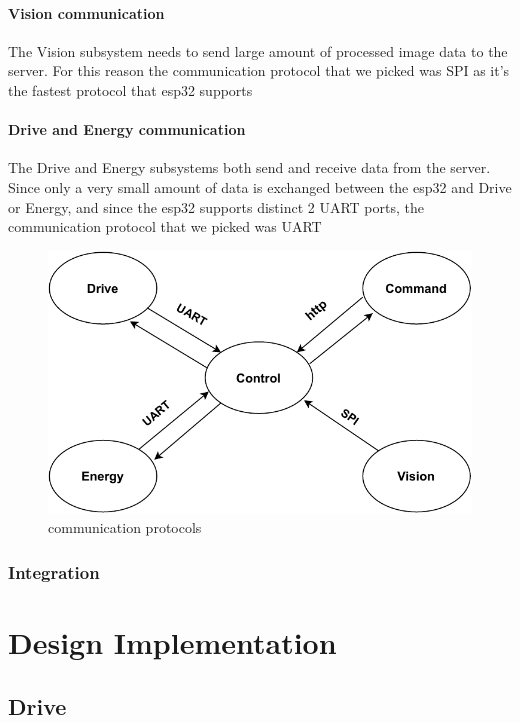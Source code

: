 \documentclass[10pt,twoside]{article}
\begin{document}
\paragraph{Vision communication}
The Vision subsystem needs to send large amount of processed image data to the server. For this reason the communication protocol that we picked was SPI as it's the fastest protocol that esp32 supports

\paragraph{Drive and Energy communication}
The Drive and Energy subsystems both send and receive data from the server. Since only a very small amount of data is exchanged between the esp32 and Drive or Energy, and since the esp32 supports distinct 2 UART ports, the communication protocol that we picked was UART

\begin{figure}[hbt!]
    \centering
    \includegraphics[scale=0.40]{esp32_comms.pdf}
    \captionsetup{justification=centering}
    \caption{communication protocols}
\end{figure}

\newpage
\subsubsection{Integration}

\newpage

\section{Design Implementation}

\subsection{Drive}
\end{document}
